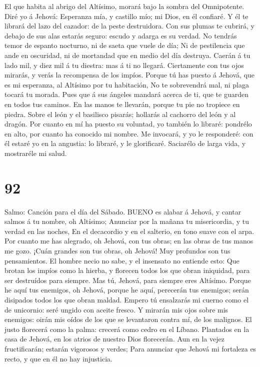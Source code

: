  El que habita al abrigo del Altísimo, morará bajo la sombra
del Omnipotente.  Diré yo á Jehová: Esperanza mía, y
castillo mío; mi Dios, en él confiaré.  Y él te librará del
lazo del cazador: de la peste destruidora.  Con sus plumas
te cubrirá, y debajo de sus alas estarás seguro: escudo y adarga es su
verdad.  No tendrás temor de espanto nocturno, ni de saeta
que vuele de día;  Ni de pestilencia que ande en oscuridad,
ni de mortandad que en medio del día destruya.  Caerán á tu
lado mil, y diez mil á tu diestra: mas á ti no llegará. 
Ciertamente con tus ojos mirarás, y verás la recompensa de los impíos.
 Porque tú has puesto á Jehová, que es mi esperanza, al
Altísimo por tu habitación,  No te sobrevendrá mal, ni
plaga tocará tu morada.  Pues que á sus ángeles mandará
acerca de ti, que te guarden en todos tus caminos.  En las
manos te llevarán, porque tu pie no tropiece en piedra. 
Sobre el león y el basilisco pisarás; hollarás al cachorro del león y al
dragón.  Por cuanto en mí ha puesto su voluntad, yo también
lo libraré: pondrélo en alto, por cuanto ha conocido mi nombre.
 Me invocará, y yo le responderé: con él estaré yo en la
angustia: lo libraré, y le glorificaré.  Saciarélo de larga
vida, y mostraréle mi salud.

\hypertarget{section-91}{%
\section{92}\label{section-91}}

 Salmo: Canción para el día del Sábado. BUENO es alabar á
Jehová, y cantar salmos á tu nombre, oh Altísimo;  Anunciar
por la mañana tu misericordia, y tu verdad en las noches, 
En el decacordio y en el salterio, en tono suave con el arpa.
 Por cuanto me has alegrado, oh Jehová, con tus obras; en
las obras de tus manos me gozo.  ¡Cuán grandes son tus
obras, oh Jehová! Muy profundos son tus pensamientos.  El
hombre necio no sabe, y el insensato no entiende esto:  Que
brotan los impíos como la hierba, y florecen todos los que obran
iniquidad, para ser destruídos para siempre.  Mas tú,
Jehová, para siempre eres Altísimo.  Porque he aquí tus
enemigos, oh Jehová, porque he aquí, perecerán tus enemigos; serán
disipados todos los que obran maldad.  Empero tú ensalzarás
mi cuerno como el de unicornio: seré ungido con aceite fresco.
 Y mirarán mis ojos sobre mis enemigos: oirán mis oídos de
los que se levantaron contra mí, de los malignos.  El justo
florecerá como la palma: crecerá como cedro en el Líbano. 
Plantados en la casa de Jehová, en los atrios de nuestro Dios
florecerán.  Aun en la vejez fructificarán; estarán
vigorosos y verdes;  Para anunciar que Jehová mi fortaleza
es recto, y que en él no hay injusticia.

